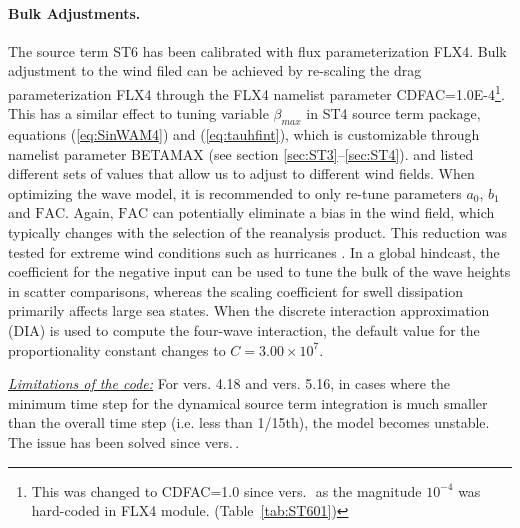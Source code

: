 \paragraph{Bulk Adjustments.} The source term
{\code ST6} has been calibrated with flux parameterization {\code FLX4}.
Bulk adjustment to the wind filed can be achieved by re-scaling the drag
parameterization {\code FLX4} through the {\F FLX4} namelist parameter {\code
 CDFAC=1.0E-4}\footnote{This was changed to {\code CDFAC=1.0} since vers.\,\WWver\ as the magnitude $10^{-4}$ was hard-coded
in {\code FLX4} module. (Table~\ref{tab:ST601})}. This has a similar effect to tuning variable
$\beta_{max}$ in {\code ST4} source term package, equations
(\ref{eq:SinWAM4}) and (\ref{eq:tauhfint}), which is customizable
through namelist parameter {\code BETAMAX} (see section
\ref{sec:ST3}--\ref{sec:ST4}). \citet{pro:Aea11} and \citet{art:RA13}
listed different sets of values that allow us to adjust to different
wind fields. When optimizing the wave model, it is recommended to
only re-tune parameters $a_0$, $b_1$ and $\mathrm{FAC}$. Again, $\mathrm{FAC}$
can potentially eliminate a bias in the wind field, which typically changes
with the selection of the reanalysis product. This reduction was tested
for extreme wind conditions such as hurricanes \citep{art:ZBRY15}.  In
a global hindcast, the coefficient for the negative input can be used to tune
the bulk of the wave heights in scatter comparisons, whereas the scaling
coefficient for swell dissipation primarily affects large sea states.
When the discrete interaction approximation ({\code DIA}) is used to compute the four-wave
interaction, the default value for the proportionality constant changes to
$C=3.00\times10^7$.

\textrm{\textit{\underline{Limitations of the code:}}} For vers. 4.18 and
vers. 5.16, in cases where the minimum time step for the dynamical source term
integration is much smaller than the overall time step (i.e. less than
1/15th), the model becomes unstable. The issue has been solved since vers.\,\WWver.
